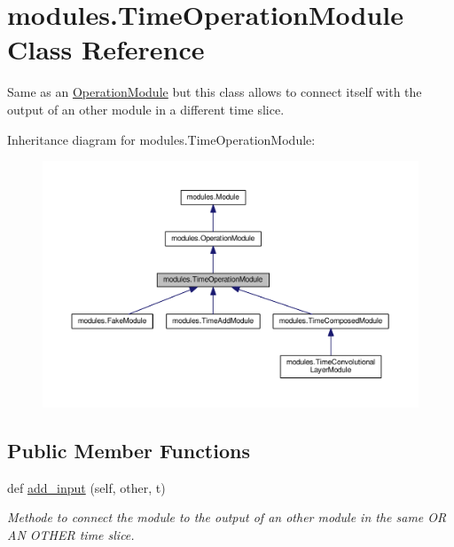\hypertarget{classmodules_1_1_time_operation_module}{}\section{modules.\+Time\+Operation\+Module Class Reference}
\label{classmodules_1_1_time_operation_module}


Same as an \hyperlink{classmodules_1_1_operation_module}{Operation\+Module} but this class allows to connect itself with the output of an other module in a different time slice.  




Inheritance diagram for modules.\+Time\+Operation\+Module\+:\nopagebreak
\begin{figure}[H]
\begin{center}
\leavevmode
\includegraphics[width=350pt]{classmodules_1_1_time_operation_module__inherit__graph}
\end{center}
\end{figure}
\subsection*{Public Member Functions}
\begin{DoxyCompactItemize}
\item 
def \hyperlink{classmodules_1_1_time_operation_module_a3076a344fba6d85b134a6d4b5d2fba46}{add\+\_\+input} (self, other, t)
\begin{DoxyCompactList}\small\item\em Methode to connect the module to the output of an other module in the same OR AN O\+T\+H\+ER time slice. \end{DoxyCompactList}\end{DoxyCompactItemize}

